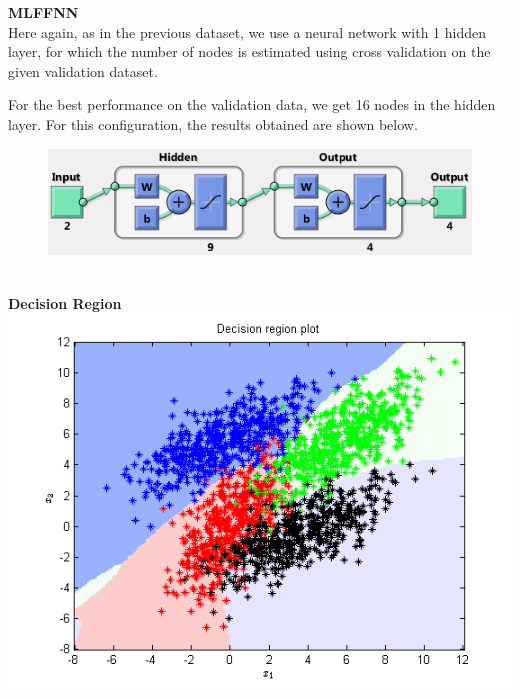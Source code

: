 \documentclass{article}
\begin{document}
\begin{flushleft}
\textbf{MLFFNN} \\[10pt]
Here again, as in the previous dataset, we use a neural network with 1 hidden layer, for which the number of nodes is estimated using cross validation on the given validation dataset.

For the best performance on the validation data, we get 16 nodes in the hidden layer. For this configuration, the results obtained are shown below.
\\[5pt]
\begin{figure}
\centering
\includegraphics[scale=0.6]{Classification/overlapping/net_config}
\end{figure}
\newpage
\textbf{\\[5pt]Decision Region\\[10pt]}
\includegraphics[scale=1]{Classification/overlapping/decn_region_nn}
\end{flushleft}
\end{document}
